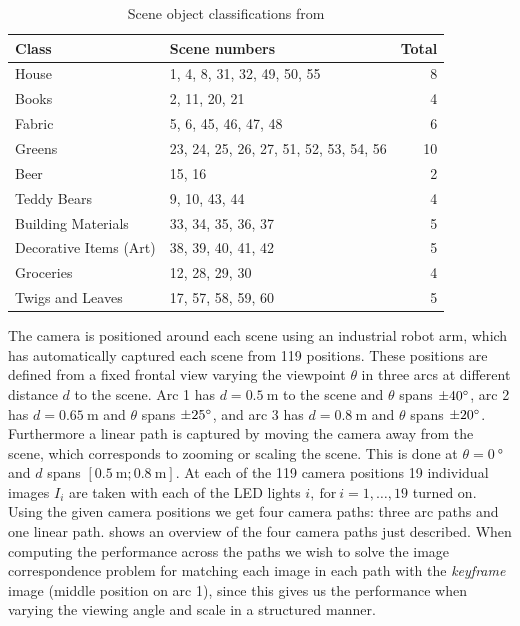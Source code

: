 \documentclass[thesis.tex]{subfiles}
\begin{document}
\begin{table}[tb]
	\centering
	\begin{tabular}{l l r}
		\toprule
		Class & Scene numbers & Total \\
		\midrule
		House					& 1, 4, 8, 31, 32, 49, 50, 55				& 8 \\
		Books					& 2, 11, 20, 21								& 4 \\
		Fabric					& 5, 6, 45, 46, 47, 48						& 6 \\
		Greens					& 23, 24, 25, 26, 27, 51, 52, 53, 54, 56	& 10 \\
		Beer  					& 15, 16									& 2 \\
		Teddy Bears 			& 9, 10, 43, 44								& 4 \\
		Building Materials 		& 33, 34, 35, 36, 37						& 5 \\
		Decorative Items (Art) 	& 38, 39, 40, 41, 42						& 5 \\
		Groceries 				& 12, 28, 29, 30							& 4 \\
		Twigs and Leaves 		& 17, 57, 58, 59, 60 						& 5 \\
		\bottomrule
	\end{tabular}
	\caption{Scene object classifications from \cite[Table 1]{aanaes2010ground}}
	\label{tbl:dtu_scene_classifications}
\end{table}

The camera is positioned around each scene using an industrial robot arm, which has automatically captured each scene from 119 positions. These positions are defined from a fixed frontal view varying the viewpoint $\theta$ in three arcs at different distance $d$ to the scene. Arc 1 has $d = \SI{0.5}{\meter}$ to the scene and $\theta$ spans $\SI{\pm40}{\degree}$, arc 2 has $d = \SI{0.65}{\meter}$ and $\theta$ spans $\SI{\pm25}{\degree}$, and arc 3 has $d = \SI{0.8}{\meter}$ and $\theta$ spans $\SI{\pm20}{\degree}$. Furthermore a linear path is captured by moving the camera away from the scene, which corresponds to zooming or scaling the scene. This is done at $\theta = \SI{0}{\degree}$ and $d$ spans $[\SI{0.5}{\meter};\SI{0.8}{\meter} ]$. At each of the 119 camera positions 19 individual images $I_i$ are taken with each of the LED lights $i,~\text{for}~i = 1,\hdots,19$ turned on. Using the given camera positions we get four camera paths: three arc paths and one linear path.  shows an overview of the four camera paths just described. When computing the performance across the paths we wish to solve the image correspondence problem for matching each image in each path with the \emph{keyframe} image (middle position on arc 1), since this gives us the performance when varying the viewing angle and scale in a structured manner.
\end{document}
